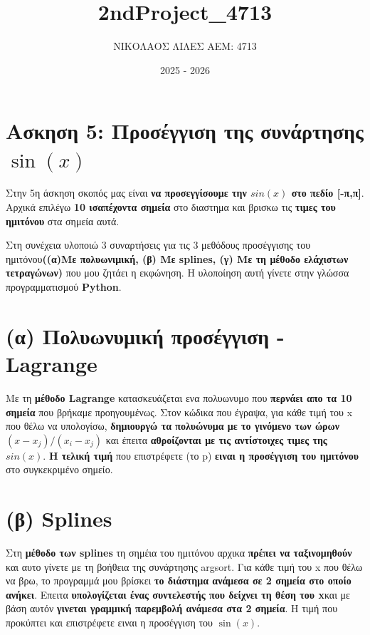 \documentclass[18pt]{article}
\title{\Huge 2ndProject\_4713}
\author{\Large ΝΙΚΟΛΑΟΣ ΛΙΛΕΣ AEM: 4713}
\date{2025 - 2026}
\begin{document}
\maketitle

\newpage
\section*{Ασκηση 5: Προσέγγιση της συνάρτησης $\sin(x)$}

\vspace{0.5cm}
Στην 5η άσκηση σκοπός μας είναι \textbf{να προσεγγίσουμε την $sin(x)$ στο πεδίο [-π,π]}. Αρχικά επιλέγω \textbf{10 ισαπέχοντα σημεία} στο διαστημα και βρισκω τις \textbf{τιμες του ημιτόνου} στα σημεία αυτά.

Στη συνέχεια υλοποιώ 3 συναρτήσεις για τις 3 μεθόδους προσέγγισης του ημιτόνου\textbf{((α)Με πολυωνιμική, (β) Με splines, (γ) Με τη μέθοδο ελάχιστων τετραγώνων)} που μου ζητάει η εκφώνηση. Η υλοποίηση αυτή γίνετε στην γλώσσα προγραμματισμού \textbf{Python}.

\vspace{0.2cm}
\section*{(α) Πολυωνυμική προσέγγιση - Lagrange}
Με τη \textbf{μέθοδο Lagrange} κατασκευάζεται ενα πολυωνυμο που \textbf{περνάει απο τα 10 σημεία} που βρήκαμε προηγουμένως. Στον κώδικα που έγραψα, για κάθε τιμή του x που θέλω να υπολογίσω, \textbf{δημιουργώ τα πολυώνυμα με το γινόμενο των ώρων$(x - x_j)/(x_i - x_j)$} και έπειτα \textbf{αθροίζονται με τις αντίστοιχες τιμες της $sin(x)$}. \textbf{Η τελική τιμή} που επιστρέφετε (το p) \textbf{ειναι η προσέγγιση του ημιτόνου} στο συγκεκριμένο σημείο.


\vspace{0.2cm}
\section*{(β) Splines}
Στη \textbf{μέθοδο των splines} τη σημέια του ημιτόνου αρχικα\textbf{ πρέπει να ταξινομηθούν} και αυτο γίνετε με τη βοήθεια της συνάρτησης argsort. Για κάθε τιμή του x που θέλω να βρω, το προγραμμά μου βρίσκει \textbf{το διάστημα ανάμεσα σε 2 σημεία στο οποίο ανήκει}. Επειτα\textbf{ υπολογίζεται ένας συντελεστής που δείχνει τη θέση του x}και με βάση αυτόν\textbf{ γινεται γραμμική παρεμβολή ανάμεσα στα 2 σημεία}. Η τιμή που προκύπτει και επιστρέφετε ειναι η προσέγγιση του $\sin(x)$.
\end{document}
